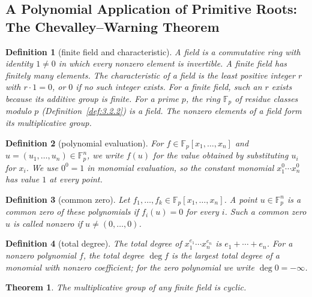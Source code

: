 \documentclass[11pt]{article}
\theoremstyle{ntstyle}
\newtheorem{theorem}{Theorem}[subsection]
\newtheorem{definition}{Definition}[subsection]
\begin{document}
\subsection{A Polynomial Application of Primitive Roots: The Chevalley--Warning Theorem}

\begin{definition}[finite field and characteristic]\label{def:6.10.1}
	A field is a commutative ring with identity $1\neq0$ in which every
	nonzero element is invertible. A finite field has finitely many elements. The
	characteristic of a field is the least positive integer $r$ with
	$r\cdot1=0$, or $0$ if no such integer exists. For a finite field,
	such an $r$ exists because its additive group is finite.
	For a prime $p$, the ring $\mathbb{F}_p$ of residue classes modulo $p$
	(Definition~\ref{def:3.2.2}) is a field. The nonzero elements of a field form its
	multiplicative group.
\end{definition}
\begin{definition}[polynomial evaluation]\label{def:6.10.2}
	For $f\in\mathbb{F}_p[x_1,\ldots,x_n]$ and
	$u=(u_1,\ldots,u_n)\in\mathbb{F}_p^n$, we write $f(u)$ for the value obtained by
	substituting $u_i$ for $x_i$. We use $0^0=1$ in monomial evaluation, so
	the constant monomial $x_1^0\cdots x_n^0$ has value $1$ at every point.
\end{definition}
\begin{definition}[common zero]\label{def:6.10.3}
	Let $f_1,\ldots,f_k\in\mathbb{F}_p[x_1,\ldots,x_n]$. A point
	$u\in\mathbb{F}_p^n$ is a common zero of these polynomials if
	$f_i(u)=0$ for every $i$. Such a common zero $u$ is called nonzero if $u\neq(0,\ldots,0)$.
\end{definition}
\begin{definition}[total degree]\label{def:6.10.4}
	The total degree of $x_1^{e_1}\cdots x_n^{e_n}$ is
	$e_1+\cdots+e_n$. For a nonzero polynomial $f$, the total degree $\deg f$ is the largest
	total degree of a monomial with nonzero coefficient; for the zero polynomial we write $\deg0=-\infty$.
\end{definition}
\begin{theorem}\label{thm:6.10.1} The multiplicative group of any finite
	field is cyclic.
\end{theorem}
\end{document}
